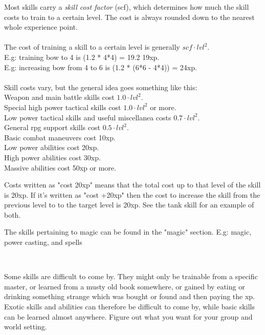 Most skills carry a \emph{skill cost factor} (scf), which determines how much the skill costs to train to a certain level. The cost is always rounded down to the nearest whole experience point.\\
\\
The cost of training a skill to a certain level is generally $scf \cdot lvl^2$. \\
E.g: training bow to 4 is (1.2 * 4*4) = 19.2 \ca 19xp. \\
E.g: increasing bow from 4 to 6 is (1.2 * (6*6 - 4*4)) = 24xp. \\
\\
Skill costs vary, but the general idea goes something like this: \\
Weapon and main battle skills cost $1.0 \cdot lvl^2$. \\
Special high power tactical skills cost $1.0 \cdot lvl^2$ or more. \\
Low power tactical skills and useful miscellanea costs $0.7 \cdot lvl^2$. \\
General rpg support skills cost $0.5 \cdot lvl^2$. \\
Basic combat maneuvers cost 10xp. \\
Low power abilities cost 20xp. \\
High power abilities cost 30xp. \\
Massive abilities cost 50xp or more.

Costs written as "cost 20xp" means that the total cost up to that level of the skill is 20xp. If it's written as "cost +20xp" then the cost to increase the skill from the previous level to to the target level is 20xp. See the tank skill for an example of both.

The skills pertaining to magic can be found in the "magic" section.
E.g: magic, power casting, and spells

\

Some skills are difficult to come by. They might only be trainable from a specific master, or learned from a musty old book somewhere, or gained by eating or drinking something strange which was bought or found and then paying the xp. Exotic skills and abilities can therefore be difficult to come by, while basic skills can be learned almost anywhere. Figure out what you want for your group and world setting.

